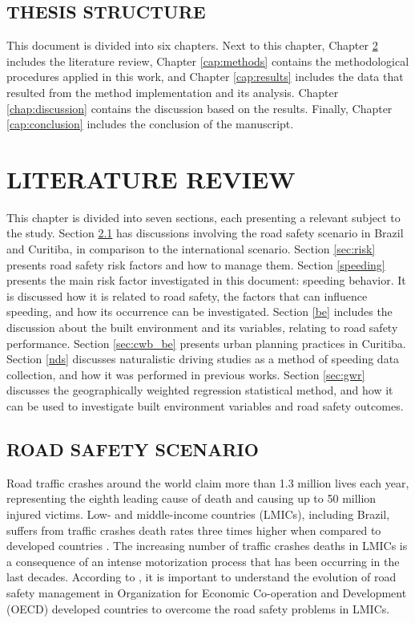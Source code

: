 \section{THESIS STRUCTURE}

This document is divided into six chapters. Next to this chapter, Chapter \ref{cap:lr} includes the literature review, Chapter \ref{cap:methods} contains the methodological procedures applied in this work, and Chapter \ref{cap:results} includes the data that resulted from the method implementation and its analysis. Chapter \ref{chap:discussion} contains the discussion based on the results. Finally, Chapter \ref{cap:conclusion} includes the conclusion of the manuscript. 


\chapter{LITERATURE REVIEW} \label{cap:lr}

This chapter is divided into seven sections, each presenting a relevant subject to the study. Section \ref{sec:rss} has discussions involving the road safety scenario in Brazil and Curitiba, in comparison to the international scenario. Section \ref{sec:risk} presents road safety risk factors and how to manage them. Section \ref{speeding} presents the main risk factor investigated in this document: speeding behavior. It is discussed how it is related to road safety, the factors that can influence speeding, and how its occurrence can be investigated. Section \ref{be} includes the discussion about the built environment and its variables, relating to road safety performance. Section \ref{sec:cwb_be} presents urban planning practices in Curitiba. Section \ref{nds} discusses naturalistic driving studies as a method of speeding data collection, and how it was performed in previous works. Section \ref{sec:gwr} discusses the geographically weighted regression statistical method, and how it can be used to investigate built environment variables and road safety outcomes.

\section{ROAD SAFETY SCENARIO} \label{sec:rss}

Road traffic crashes around the world claim more than 1.3 million lives each year, representing the eighth leading cause of death and causing up to 50 million injured victims. Low- and middle-income countries (LMICs), including Brazil, suffers from traffic crashes death rates three times higher when compared to developed countries \cite{WHO2018}. The increasing number of traffic crashes deaths in LMICs is a consequence of an intense motorization process that has been occurring in the last decades. According to \textcite{Bhalla2016}, it is important to understand the evolution of road safety management in Organization for Economic Co-operation and Development (OECD) developed countries to overcome the road safety problems in LMICs. 

